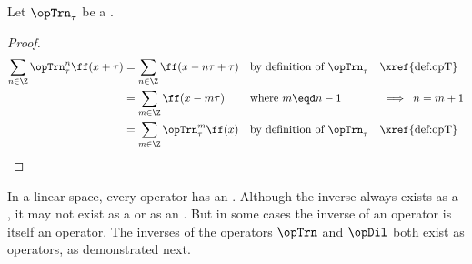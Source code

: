 \begin{proposition}
\label{prop:opT_periodic}
Let $\opTrn_\tau$ be a  .
\end{proposition}
\begin{proof}
\begin{align*}
  \sum_{n\in\Z}\opTrn_\tau^n\ff(x+\tau)
    &= \sum_{n\in\Z}\ff(x-n\tau+\tau)
    && \text{by definition of $\opTrn_\tau$} && \text{\xref{def:opT}}
  \\&= \sum_{m\in\Z}\ff(x-m\tau)
    && \text{where $m\eqd n-1$}         && \implies\;n=m+1
  \\&= \sum_{m\in\Z}\opTrn_\tau^m\ff(x)
    && \text{by definition of $\opTrn_\tau$} && \text{\xref{def:opT}}
\end{align*}
\end{proof}



In a linear space, every operator has an .
Although the inverse always exists as a ,
it may not exist as a or as an .
But in some cases the inverse of an operator is itself an operator.
The inverses of the operators $\opTrn$ and $\opDil$ both exist as operators,
as demonstrated next.

